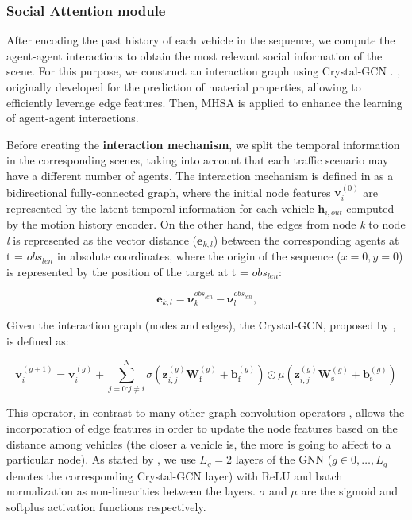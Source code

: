 \subsubsection{Social Attention module}
\label{subsubsec:6_efficient_baselines_social_interactions}

After encoding the past history of each vehicle in the sequence, we compute the agent-agent interactions to obtain the most relevant social information of the scene. For this purpose, we construct an interaction graph using Crystal-GCN \cite{xie2018crystal} \cite{schmidt2022crat}. , originally developed for the prediction of material properties, allowing to efficiently leverage edge features. Then, \ac{MHSA} \cite{vaswani2017attention} is applied to enhance the learning of agent-agent interactions. 

Before creating the \textbf{interaction mechanism}, we split the temporal information in the corresponding scenes, taking into account that each traffic scenario may have a different number of agents. The interaction mechanism is defined in \cite{schmidt2022crat} as a bidirectional fully-connected graph, where the initial node features $\mathbf{v}_i^{(0)}$ are represented by the latent temporal information for each vehicle $\mathbf{h}_{i,out}$ computed by the motion history encoder. On the other hand, the edges from node \textit{k} to node \textit{l} is represented as the vector distance ($\mathbf{e}_{k,l}$) between the corresponding agents at t = \textit{$obs_{len}$} in absolute coordinates, where the origin of the sequence ($x=0,y=0$) is represented by the position of the target at t = \textit{$obs_{len}$}:

\begin{equation}
	\mathbf{e}_{k,l} = \boldsymbol{\nu}^{obs_{len}}_k - \boldsymbol{\nu}^{obs_{len}}_l \text{,}
\end{equation}

Given the interaction graph (nodes and edges), the Crystal-GCN, proposed by \cite{xie2018crystal}, is defined as:

\begin{equation}
	\mathbf{v}_i^{(g+1)} = \mathbf{v}_i^{(g)} +
	\sum_{j = 0 \textbf{:} j \neq i }^{N} \sigma \left( \mathbf{z}_{i,j}^{(g)} \mathbf{W}_\mathrm{f}^{(g)} + \mathbf{b}_\mathrm{f}^{(g)} \right)
	\odot \mu \left( \mathbf{z}_{i,j}^{(g)} \mathbf{W}_\mathrm{s}^{(g)} + \mathbf{b}_\mathrm{s}^{(g)}  \right)
\end{equation}

This operator, in contrast to many other graph convolution operators \cite{zeng2021lanercnn} \cite{liang2020learning}, allows the incorporation of edge features in order to update the node features based on the distance among vehicles (the closer a vehicle is, the more is going to affect to a particular node). As stated by \cite{schmidt2022crat}, we use $L_g = 2$ layers of the GNN ($g \in 0, \dots , L_g$ denotes the corresponding Crystal-GCN layer) with ReLU and batch normalization as non-linearities between the layers. $\sigma$ and $\mu$ are the sigmoid and softplus activation functions respectively. 


